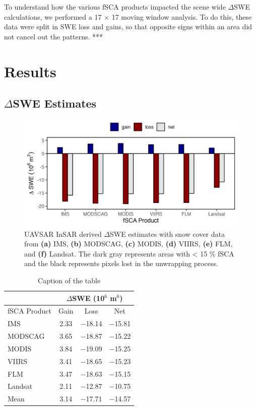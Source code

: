To understand how the various fSCA products impacted the scene wide $\Delta$SWE calculations, we performed a 17 $\times$ 17 moving window analysis. To do this, these data were split in SWE loss and gains, so that opposite signs within an area did not cancel out the patterns. ***

\hypertarget{ch4-results}{\section{Results}\label{ch4-results}}
\hypertarget{ch4-results}{\subsection{$\Delta$SWE Estimates}\label{ch4-results}}


\clearpage
\begin{figure}[h]
\centering
\label{fig:dswe_bar_graph}
\includegraphics[width=14cm]{figures/ch4_figs/dswe_stats_new_v10.png}
\caption{UAVSAR InSAR derived $\Delta$SWE estimates with snow cover data from \textbf{(a)} IMS, \textbf{(b)} MODSCAG, \textbf{(c)} MODIS, \textbf{(d)} VIIRS, \textbf{(e)} FLM, and \textbf{(f)} Landsat. The dark gray represents areas with < 15 \% fSCA and the black represents pixels lost in the unwrapping process.}
\end{figure}

\begin{table}
\centering
\caption{Caption of the table}
\label{tab:dswe_stats}
\begin{tabular}{lccc}
\toprule
& \multicolumn{3}{c}{$\Delta$SWE (10$^{6}$ m$^{6}$)} \\
\midrule
fSCA Product & Gain & Loss & Net \\
\midrule
IMS & 2.33 & $-$18.14 & $-$15.81 \\
MODSCAG & 3.65 & $-$18.87 & $-$15.22 \\
MODIS & 3.84 & $-$19.09 & $-$15.25 \\
VIIRS & 3.41 & $-$18.65 & $-$15.23 \\
FLM & 3.47 & $-$18.63 & $-$15.15 \\
Landsat & 2.11 & $-$12.87 & $-$10.75 \\
\midrule
Mean	& 3.14 & $-$17.71 &	$-$14.57 \\
\bottomrule
\end{tabular}
\end{table}

